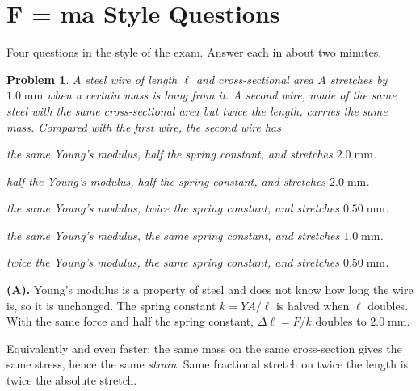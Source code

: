 \documentclass[11pt]{article}
\newcommand{\clearpts}{\addtocounter{tpts}{\value{cpts}} \setcounter{cpts}{0}}
\newcommand{\pts}[1]{\clearpts \setcounter{cpts}{#1}}
\theoremstyle{mystyle}
\newtheorem{pproblem}{Problem}
\begin{document}
\section{F = ma Style Questions}

\noindent
Four questions in the style of the exam. Answer each in about two minutes.

\pts{4}
\begin{pproblem}
A steel wire of length $\ell$ and cross-sectional area $A$ stretches by $1.0\;\mathrm{mm}$
when a certain mass is hung from it. A second wire, made of the same steel with the same
cross-sectional area but \emph{twice the length}, carries the same mass. Compared with the
first wire, the second wire has
\begin{mcchoices}
\item the same Young's modulus, half the spring constant, and stretches $2.0\;\mathrm{mm}$.
\item half the Young's modulus, half the spring constant, and stretches $2.0\;\mathrm{mm}$.
\item the same Young's modulus, twice the spring constant, and stretches
$0.50\;\mathrm{mm}$.
\item the same Young's modulus, the same spring constant, and stretches
$1.0\;\mathrm{mm}$.
\item twice the Young's modulus, the same spring constant, and stretches
$0.50\;\mathrm{mm}$.
\end{mcchoices}
\end{pproblem}
\begin{solution}
\textbf{(A).} Young's modulus is a property of steel and does not know how long the wire
is, so it is unchanged. The spring constant $k = YA/\ell$ is halved when $\ell$ doubles.
With the same force and half the spring constant, $\Delta \ell = F/k$ doubles to
$2.0\;\mathrm{mm}$.

Equivalently and even faster: the same mass on the same cross-section gives the same
stress, hence the same \emph{strain}. Same fractional stretch on twice the length is twice
the absolute stretch.
\end{solution}
\end{document}
